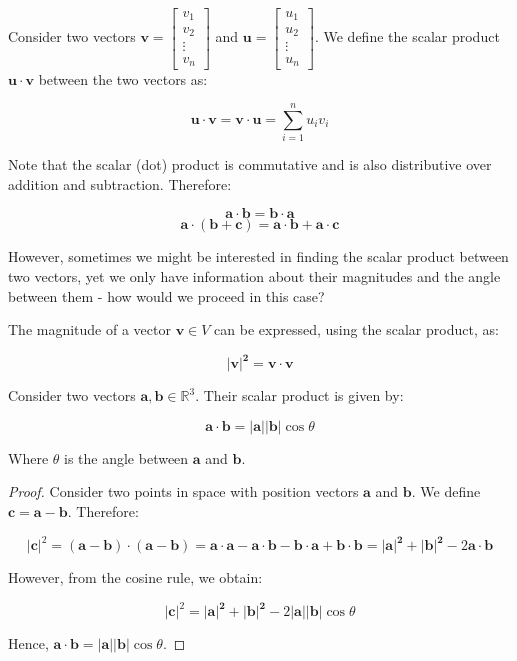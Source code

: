 \documentclass[12pt]{article}
\begin{document}
\begin{definition}
    Consider two vectors $\mathbf{v} = \begin{bmatrix}
        v_1 \\
        v_2 \\
        \vdots \\
        v_n
    \end{bmatrix}$ and $\mathbf{u} = \begin{bmatrix}
        u_1 \\
        u_2 \\
        \vdots \\
        u_n
    \end{bmatrix}$. We define the scalar product $\mathbf{u} \cdot \mathbf{v}$ between the two vectors as:

    \[ \mathbf{u} \cdot \mathbf{v} = \mathbf{v} \cdot \mathbf{u} = \sum_{i = 1}^n u_iv_i \]
\end{definition}

Note that the scalar (dot) product is commutative and is also distributive over addition and subtraction. Therefore:

\[ \mathbf{a \cdot b} = \mathbf{b \cdot a} \]
\[  \mathbf{a \cdot (\mathbf{b} + \mathbf{c})} = \mathbf{a \cdot b} + \mathbf{a \cdot c} \]

However, sometimes we might be interested in finding the scalar product between two vectors, yet we only have information about their magnitudes and the angle between them - how would we proceed in this case?

\begin{proposition}
    The magnitude of a vector $\mathbf{v} \in V$ can be expressed, using the scalar product, as:

    \[ \mathbf{|v|^2} = \mathbf{v \cdot v} \]
\end{proposition}

\begin{theorem}
    Consider two vectors $\mathbf{a, b} \in \mathbb{R}^3$. Their scalar product is given by:

    \[ \mathbf{a \cdot b} = \mathbf{|a||b|}\cos{\theta} \]

    Where $\theta$ is the angle between $\mathbf{a}$ and $\mathbf{b}$.
\end{theorem}

\begin{proof}
    Consider two points in space with position vectors $\mathbf{a}$ and $\mathbf{b}$. We define $\mathbf{c = a - b}$. Therefore:

    \[ \mathbf{|c|}^2 = \mathbf{(a - b) \cdot (a - b)} = \mathbf{a \cdot a - a \cdot b - b \cdot a + b \cdot b} = \mathbf{|a|^2 + |b|^2} - 2\mathbf{a \cdot b } \]

    However, from the cosine rule, we obtain:

    \[ \mathbf{|c|}^2 = \mathbf{|a|^2 + |b|^2} - 2\mathbf{|a||b|}\cos{\theta} \]

    Hence, $\mathbf{a \cdot b} = \mathbf{|a||b|}\cos{\theta}$.
\end{proof}
\end{document}
